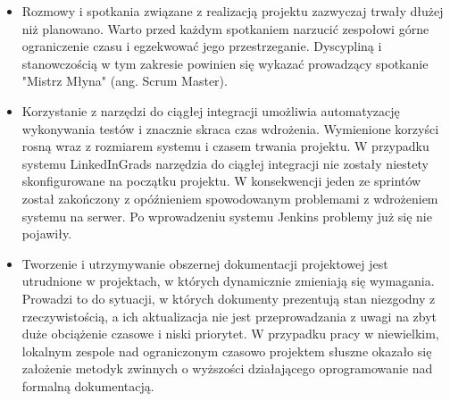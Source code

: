 \begin{itemize}
\item Rozmowy i spotkania związane z realizacją projektu zazwyczaj trwały dłużej niż planowano. Warto przed każdym spotkaniem narzucić zespołowi górne ograniczenie czasu i egzekwować jego przestrzeganie. Dyscypliną i stanowczością w tym zakresie powinien się wykazać prowadzący spotkanie  "Mistrz Młyna" (ang. Scrum Master).
\item Korzystanie z narzędzi do ciągłej integracji umożliwia automatyzację wykonywania testów i znacznie skraca czas wdrożenia. Wymienione korzyści rosną wraz z rozmiarem systemu i czasem trwania projektu. W przypadku systemu LinkedInGrads narzędzia do ciągłej integracji nie zostały niestety skonfigurowane na początku projektu. W konsekwencji jeden ze sprintów został zakończony z opóźnieniem spowodowanym problemami z wdrożeniem systemu na serwer. Po wprowadzeniu systemu Jenkins problemy już się nie pojawiły.
\item Tworzenie i utrzymywanie obszernej dokumentacji projektowej jest utrudnione w projektach, w których dynamicznie zmieniają się wymagania. Prowadzi to do sytuacji, w których dokumenty prezentują stan niezgodny z rzeczywistością, a ich aktualizacja nie jest przeprowadzania z uwagi na zbyt duże obciążenie czasowe i niski priorytet. W przypadku pracy w niewielkim, lokalnym zespole nad ograniczonym czasowo projektem słuszne okazało się założenie metodyk zwinnych o wyższości działającego oprogramowanie nad formalną dokumentacją.

\end{itemize}